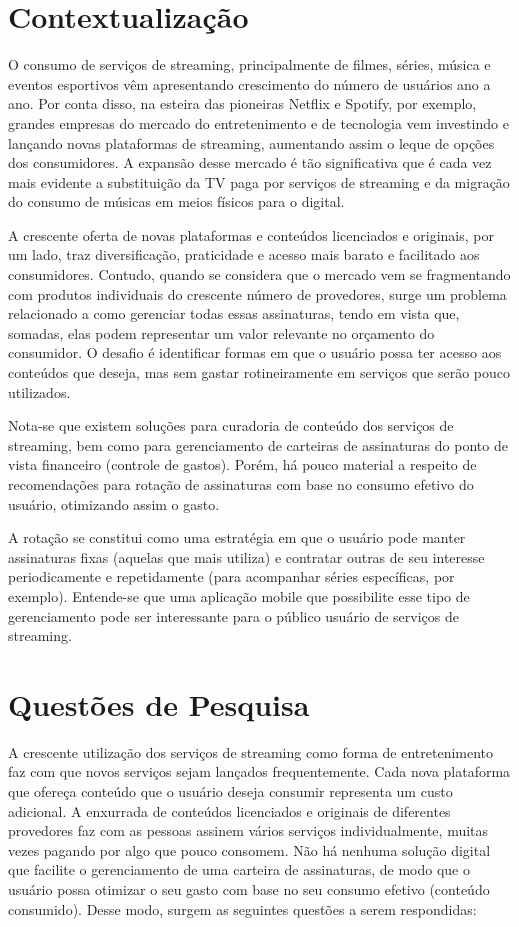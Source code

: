 \documentclass[conference]{IEEEtran}
\begin{document}
\section{Contextualização}

O consumo de serviços de streaming, principalmente de filmes, séries, música e eventos esportivos vêm apresentando crescimento  do número de usuários ano a ano. Por conta disso, na esteira das pioneiras Netflix e Spotify, por exemplo, grandes empresas do mercado do entretenimento e de tecnologia vem investindo e lançando novas plataformas de streaming, aumentando assim o leque de opções dos consumidores. A expansão desse mercado é tão significativa que é cada vez mais evidente a substituição da TV paga por serviços de streaming e da migração do consumo de músicas em meios físicos para o digital.

A crescente oferta de novas plataformas e conteúdos licenciados e originais, por um lado, traz diversificação, praticidade e acesso mais barato e facilitado aos consumidores. Contudo, quando se considera que o mercado vem se fragmentando com produtos individuais do crescente número de provedores, surge um problema relacionado a como gerenciar todas essas assinaturas, tendo em vista que, somadas, elas podem representar um valor relevante no orçamento do consumidor. O desafio é identificar formas em que o usuário possa ter acesso aos conteúdos que deseja, mas sem gastar  rotineiramente em serviços que serão pouco utilizados. 

Nota-se que existem soluções para curadoria de conteúdo dos serviços de streaming, bem como para gerenciamento de carteiras de assinaturas do ponto de vista financeiro (controle de gastos). Porém, há pouco material a respeito de recomendações para rotação de assinaturas com base no consumo efetivo do usuário, otimizando assim o gasto. 

A rotação se constitui como uma estratégia em que o usuário pode manter assinaturas fixas (aquelas que mais utiliza) e contratar outras de seu interesse periodicamente e repetidamente (para acompanhar séries específicas, por exemplo). Entende-se que uma aplicação mobile que possibilite esse tipo de gerenciamento pode ser interessante para o público usuário de serviços de streaming. 

\section{Questões de Pesquisa}

A crescente utilização dos serviços de streaming como forma de entretenimento faz com que novos serviços sejam lançados frequentemente. Cada nova plataforma que ofereça conteúdo que o usuário deseja consumir representa um custo adicional. A enxurrada de conteúdos licenciados e originais de diferentes provedores faz com as pessoas assinem vários serviços individualmente, muitas vezes pagando por algo que pouco consomem. Não há nenhuma solução digital que facilite o gerenciamento de uma carteira de assinaturas, de modo que o usuário possa otimizar o seu gasto com base no seu consumo efetivo (conteúdo consumido). Desse modo, surgem as seguintes questões a serem respondidas:
\end{document}
